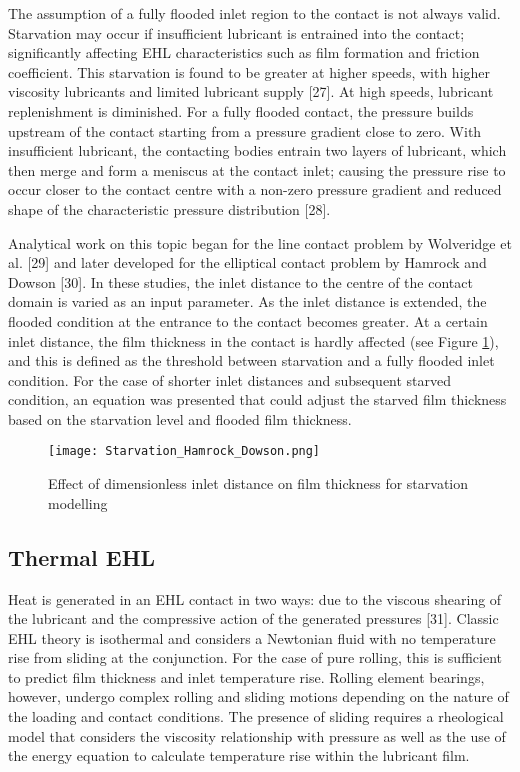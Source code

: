 The assumption of a fully flooded inlet region to the contact is not always valid. Starvation may occur if insufficient lubricant is entrained into the contact; significantly affecting EHL characteristics such as film formation and friction coefficient. This starvation is found to be greater at higher speeds, with higher viscosity lubricants and limited lubricant supply [27]. At high speeds, lubricant replenishment is diminished. For a fully flooded contact, the pressure builds upstream of the contact starting from a pressure gradient close to zero. With insufficient lubricant, the contacting bodies entrain two layers of lubricant, which then merge and form a meniscus at the contact inlet; causing the pressure rise to occur closer to the contact centre with a non-zero pressure gradient and reduced shape of the characteristic pressure distribution [28].

Analytical work on this topic began for the line contact problem by Wolveridge et al. [29] and later developed for the elliptical contact problem by Hamrock and Dowson [30]. In these studies, the inlet distance to the centre of the contact domain is varied as an input parameter. As the inlet distance is extended, the flooded condition at the entrance to the contact becomes greater. At a certain inlet distance, the film thickness in the contact is hardly affected (see Figure \ref{Starvation_Hamrock_Dowson}), and this is defined as the threshold between starvation and a fully flooded inlet condition. For the case of shorter inlet distances and subsequent starved condition, an equation was presented that could adjust the starved film thickness based on the starvation level and flooded film thickness.

\begin{figure}
	\centerline{\texttt{[image: Starvation\_Hamrock\_Dowson.png]}}
	\caption{Effect of dimensionless inlet distance on film thickness for starvation modelling \cite{Hamrock1976}}
	\label{Starvation_Hamrock_Dowson}
\end{figure}

\subsection{Thermal EHL}

Heat is generated in an EHL contact in two ways: due to the viscous shearing of the lubricant and the compressive action of the generated pressures [31]. Classic EHL theory is isothermal and considers a Newtonian fluid with no temperature rise from sliding at the conjunction. For the case of pure rolling, this is sufficient to predict film thickness and inlet temperature rise. Rolling element bearings, however, undergo complex rolling and sliding motions depending on the nature of the loading and contact conditions. The presence of sliding requires a rheological model that considers the viscosity relationship with pressure as well as the use of the energy equation to calculate temperature rise within the lubricant film.

